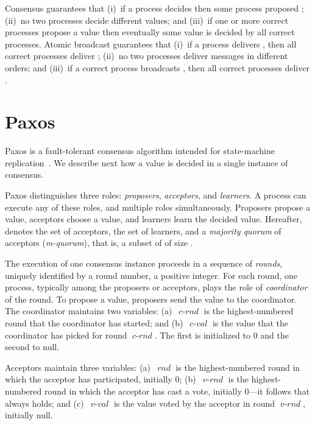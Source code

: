 \documentclass[final,3p,times,twocolumn,authoryear]{elsarticle}
\newcommand{\mv}[1]{\ensuremath{\operatorname{\mathit{#1}}}}
\begin{document}
Consensus guarantees that (i)~if a process decides  then some process proposed ; (ii)~no two processes decide different values; and (iii)~if one or more correct processes propose a value then eventually some value is decided by all correct processes.
Atomic broadcast guarantees that (i)~if a process delivers , then all correct processes deliver ; (ii)~no two processes deliver  messages in different orders; and (iii)~if a correct process broadcasts , then all correct processes deliver .



\section{Paxos}
\label{sec:paxos}

Paxos is a fault-tolerant consensus algorithm intended for state-machine replication~\cite{Lam98}.
We describe next how a value is decided in a single instance of consensus.

Paxos distinguishes three roles: \emph{proposers}, \emph{acceptors}, and \emph{learners}. A process can execute any of these roles, and multiple roles simultaneously. Proposers propose a value, acceptors choose a value, and learners learn the decided value. Hereafter,  denotes the set of acceptors,  the set of learners, and  a \emph{majority quorum} of acceptors (\emph{m-quorum}), that is, a subset of  of size .

The execution of one consensus instance proceeds in a sequence of \emph{rounds}, uniquely identified by a round number, a positive integer. For each round, one process, typically among the proposers or acceptors, plays the role of \emph{coordinator} of the round. To propose a value, proposers send the value to the coordinator.
The coordinator maintains two variables: (a)~\mv{c-rnd} is the highest-numbered round that the coordinator has started; and (b)~\mv{c-val} is the value that the coordinator has picked for round \mv{c-rnd}. The first is initialized to 0 and the second to null.

Acceptors maintain three variables: (a)~\mv{rnd} is the highest-numbered round in which the acceptor has participated, initially 0; (b)~\mv{v-rnd} is the highest-numbered round in which the acceptor has cast a vote, initially 0---it follows that  always holds; and (c)~\mv{v-val} is the value voted by the acceptor in round \mv{v-rnd}, initially null.
\end{document}
